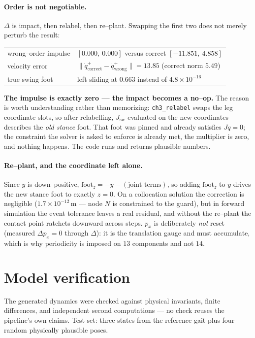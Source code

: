 \documentclass[11pt,a4paper]{article}
\newcommand{\code}[1]{\texttt{#1}}          %
\newcommand{\warn}[1]{\textcolor{red!70!black}{\textbf{#1}}}
\begin{document}
\paragraph{Order is not negotiable.}
$\Delta$ is impact, then relabel, then re--plant. Swapping the first two does not
merely perturb the result:
\begin{center}
\begin{tabular}{@{}ll@{}}
\toprule
wrong--order impulse & $[0.000,\ 0.000]$ versus correct $[-11.851,\ 4.858]$ \\
velocity error & $\lVert\dot q^{+}_{\text{correct}}-\dot q^{+}_{\text{wrong}}\rVert = 13.85$ (correct norm $5.49$) \\
true swing foot & left sliding at $0.663$ instead of $4.8\times10^{-16}$ \\
\bottomrule
\end{tabular}
\end{center}
\warn{The impulse is exactly zero --- the impact becomes a no--op.} The reason is
worth understanding rather than memorizing: \code{ch3\_relabel} swaps the leg
coordinate slots, so after relabelling, $J_{\mathrm{sw}}$ evaluated on the new
coordinates describes the \emph{old stance} foot. That foot was pinned and
already satisfies $J\dot q = 0$; the constraint the solver is asked to enforce is
already met, the multiplier is zero, and nothing happens. The code runs and
returns plausible numbers.

\paragraph{Re--plant, and the coordinate left alone.}
Since $y$ is down--positive, $\text{foot}_z = -y - (\text{joint terms})$, so
adding $\text{foot}_z$ to $y$ drives the new stance foot to exactly $z=0$. On a
collocation solution the correction is negligible ($1.7\times10^{-12}\,$m ---
node $N$ is constrained to the guard), but in forward simulation the event
tolerance leaves a real residual, and without the re--plant the contact point
ratchets downward across steps. $p_x$ is deliberately \emph{not} reset (measured
$\Delta p_x = 0$ through $\Delta$): it is the translation gauge and must
accumulate, which is why periodicity is imposed on $13$ components and not $14$.

\section{Model verification}
\label{sec:verify}
The generated dynamics were checked against physical invariants, finite
differences, and independent second computations --- no check reuses the
pipeline's own claims. Test set: three states from the reference gait plus four
random physically plausible poses.
\end{document}
